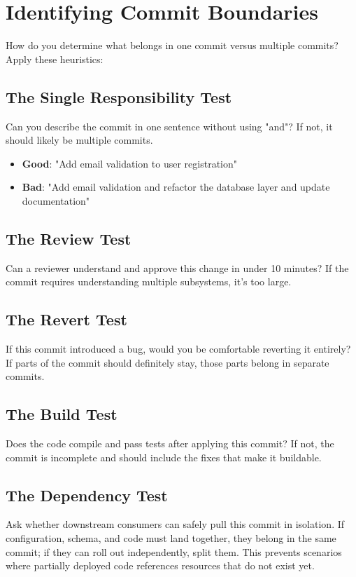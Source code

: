 \section{Identifying Commit Boundaries}

How do you determine what belongs in one commit versus multiple commits? Apply these heuristics:

\subsection{The Single Responsibility Test}
Can you describe the commit in one sentence without using "and"? If not, it should likely be multiple commits.

\begin{itemize}
  \item \textbf{Good}: "Add email validation to user registration"
  \item \textbf{Bad}: "Add email validation and refactor the database layer and update documentation"
\end{itemize}

\subsection{The Review Test}
Can a reviewer understand and approve this change in under 10 minutes? If the commit requires understanding multiple subsystems, it's too large.

\subsection{The Revert Test}
If this commit introduced a bug, would you be comfortable reverting it entirely? If parts of the commit should definitely stay, those parts belong in separate commits.

\subsection{The Build Test}
Does the code compile and pass tests after applying this commit? If not, the commit is incomplete and should include the fixes that make it buildable.

\subsection{The Dependency Test}
Ask whether downstream consumers can safely pull this commit in isolation. If configuration, schema, and code must land together, they belong in the same commit; if they can roll out independently, split them. This prevents scenarios where partially deployed code references resources that do not exist yet.

